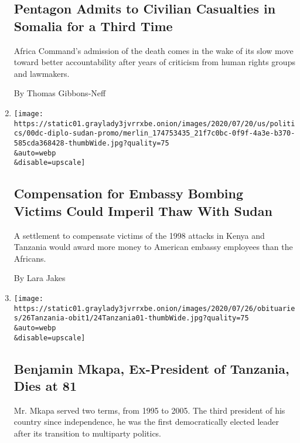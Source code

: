 \begin{enumerate}
{  \subsection{Pentagon Admits to Civilian Casualties in Somalia for a
  Third
  Time}\label{pentagon-admits-to-civilian-casualties-in-somalia-for-a-third-time}}

  Africa Command's admission of the death comes in the wake of its slow
  move toward better accountability after years of criticism from human
  rights groups and lawmakers.

  By Thomas Gibbons-Neff
\item
  \href{/2020/07/25/us/politics/sudan-compensation-embassy-bombings.html}{}

  \texttt{[image: https://static01.graylady3jvrrxbe.onion/images/2020/07/20/us/politics/00dc-diplo-sudan-promo/merlin\_174753435\_21f7c0bc-0f9f-4a3e-b370-585cda368428-thumbWide.jpg?quality=75\\\&auto=webp\\\&disable=upscale]}

  \hypertarget{compensation-for-embassy-bombing-victims-could-imperil-thaw-with-sudan}{%
  \subsection{Compensation for Embassy Bombing Victims Could Imperil
  Thaw With
  Sudan}\label{compensation-for-embassy-bombing-victims-could-imperil-thaw-with-sudan}}

  A settlement to compensate victims of the 1998 attacks in Kenya and
  Tanzania would award more money to American embassy employees than the
  Africans.

  By Lara Jakes
\item
  \href{/2020/07/24/world/africa/benjamin-mkapa-dead.html}{}

  \texttt{[image: https://static01.graylady3jvrrxbe.onion/images/2020/07/26/obituaries/26Tanzania-obit1/24Tanzania01-thumbWide.jpg?quality=75\\\&auto=webp\\\&disable=upscale]}

  \hypertarget{benjamin-mkapa-ex-president-of-tanzania-dies-at-81}{%
  \subsection{Benjamin Mkapa, Ex-President of Tanzania, Dies at
  81}\label{benjamin-mkapa-ex-president-of-tanzania-dies-at-81}}

  Mr. Mkapa served two terms, from 1995 to 2005. The third president of
  his country since independence, he was the first democratically
  elected leader after its transition to multiparty politics.


\end{enumerate}
